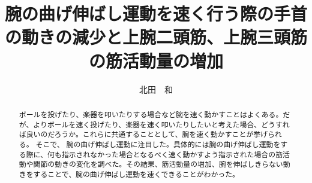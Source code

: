 \documentclass{jsarticle}
\title{腕の曲げ伸ばし運動を速く行う際の手首の動きの減少と上腕二頭筋、上腕三頭筋の筋活動量の増加}
\author{北田　和}
\begin{document}
\maketitle


\begin{abstract}

  ボールを投げたり、楽器を叩いたりする場合など腕を速く動かすことはよくある。だが、よりボールを速く投げたり、楽器を速く叩いたりしたいと考えた場合、どうすれば良いのだろうか。これらに共通することとして、腕を速く動かすことが挙げられる。
  そこで、
  腕の曲げ伸ばし運動に注目した。具体的には腕の曲げ伸ばし運動をする際に、何も指示されなかった場合となるべく速く動かすよう指示された場合の筋活動や関節の動きの変化を調べた。その結果、筋活動量の増加、腕を伸ばしきらない動きをすることで、腕の曲げ伸ばし運動を速くできることがわかった。
\end{abstract}
\end{document}

